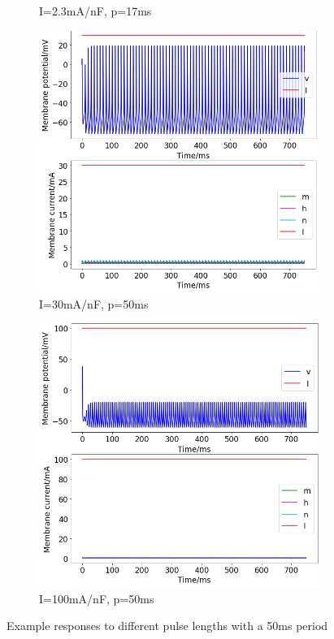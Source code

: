 \documentclass[twoside,twocolumn]{article}
\begin{document}
\begin{figure}[h]
\begin{subfigure}[t]{0.49\textwidth}
  \caption{I=2.3mA/nF, p=17ms}
  \label{sub:2c23-17}
  \end{subfigure}
\newline
\begin{subfigure}[t]{0.49\textwidth}
    \includegraphics[width=\linewidth]{p30-50}
  \caption{I=30mA/nF, p=50ms}
  \label{sub:2c30-50}
  \end{subfigure}
  \begin{subfigure}[t]{0.49\textwidth}
    \includegraphics[width=\linewidth]{p100-50}
  \caption{I=100mA/nF, p=50ms}
  \label{sub:2c100-50}
  \end{subfigure}
  \caption{Example responses to different pulse lengths with a 50ms period}
  \label{fig:2ce}
\end{figure}
\end{document}
